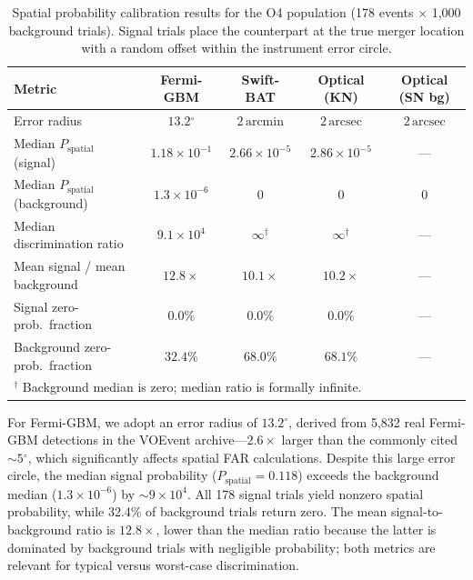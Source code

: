 \documentclass[twocolumn]{article}
\newcommand{\arcdeg}{\ensuremath{{}^{\circ}}}
\begin{document}
\begin{table}[htbp]
\centering
\caption{Spatial probability calibration results for the O4 population (178 events $\times$ 1,000 background trials). Signal trials place the counterpart at the true merger location with a random offset within the instrument error circle. \label{tab:grb_calibration}}
\begin{tabular}{lcccc}
\toprule
Metric & Fermi-GBM & Swift-BAT & Optical (KN) & Optical (SN bg) \\
\midrule
Error radius                        & $13.2\arcdeg$   & $2\,\mathrm{arcmin}$  & $2\,\mathrm{arcsec}$ & $2\,\mathrm{arcsec}$ \\
Median $P_\mathrm{spatial}$ (signal)    & $1.18 \times 10^{-1}$    & $2.66 \times 10^{-5}$  & $2.86 \times 10^{-5}$ & --- \\
Median $P_\mathrm{spatial}$ (background) & $1.3 \times 10^{-6}$   & $0$ & $0$ & $0$ \\
Median discrimination ratio         & $9.1 \times 10^{4}$ & $\infty^{\dagger}$ & $\infty^{\dagger}$ & --- \\
Mean signal / mean background       & $12.8\times$     & $10.1\times$          & $10.2\times$          & --- \\
Signal zero-prob.\ fraction    & $0.0\%$          & $0.0\%$               & $0.0\%$               & --- \\
Background zero-prob.\ fraction & $32.4\%$        & $68.0\%$              & $68.1\%$              & --- \\
\bottomrule
\multicolumn{5}{l}{\footnotesize $^\dagger$ Background median is zero; median ratio is formally infinite.} \\
\end{tabular}
\end{table}

For Fermi-GBM, we adopt an error radius of $13.2\arcdeg$, derived from 5,832 real Fermi-GBM detections in the VOEvent archive---$2.6\times$ larger than the commonly cited ${\sim}5\arcdeg$, which significantly affects spatial FAR calculations. Despite this large error circle, the median signal probability ($P_\mathrm{spatial} = 0.118$) exceeds the background median ($1.3\times10^{-6}$) by ${\sim}9\times10^4$. All 178 signal trials yield nonzero spatial probability, while 32.4\% of background trials return zero. The mean signal-to-background ratio is $12.8\times$, lower than the median ratio because the latter is dominated by background trials with negligible probability; both metrics are relevant for typical versus worst-case discrimination.
\end{document}
